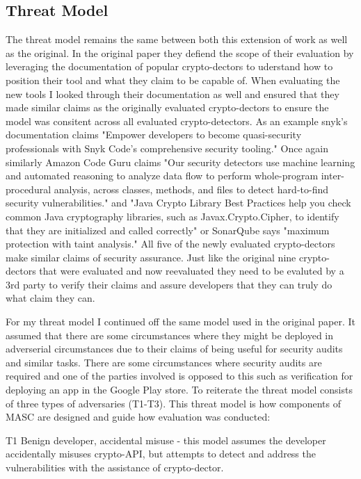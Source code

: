 \subsection{Threat Model}
\label{ch1:subsec:ThreatModel}

The threat model remains the same between both this extension of work as well as the original. In the original paper they defiend the scope of their evaluation by leveraging the documentation of popular crypto-dectors to uderstand how to position their tool and what they claim to be capable of. When evaluating the new tools I looked through their documentation as well and ensured that they made similar claims as the originally evaluated crypto-dectors to ensure the model was consitent across all evaluated crypto-detectors. As an example snyk's documentation claims "Empower developers to become quasi-security professionals with Snyk Code’s comprehensive security tooling." \cite{snyk} Once again similarly Amazon Code Guru claims "Our security detectors use machine learning and automated reasoning to analyze data flow to perform whole-program inter-procedural analysis, across classes, methods, and files to detect hard-to-find security vulnerabilities." \cite{codeguru} and "Java Crypto Library Best Practices help you check common Java cryptography libraries, such as Javax.Crypto.Cipher, to identify that they are initialized and called correctly" or SonarQube says "maximum protection with taint analysis." \cite{sonarqube} All five of the newly evaluated crypto-dectors make similar claims of security assurance. Just like the original nine crypto-dectors that were evaluated and now reevaluated they need to be evaluted by a 3rd party to verify their claims and assure developers that they can truly do what claim they can.

For my threat model I continued off the same model used in the original paper. It assumed that there are some circumstances where they might be deployed in adverserial circumstances due to their claims of being useful for security audits and similar tasks. There are some circumstances where security audits are required and one of the parties involved is opposed to this such as verification for deploying an app in the Google Play store. To reiterate the threat model consists of three types of adversaries (T1-T3). This threat model is how components of MASC are designed and guide how evaluation was conducted:

T1 Benign developer, accidental misuse - this model assumes the developer accidentally misuses crypto-API, but attempts to detect and address the vulnerabilities with the assistance of crypto-dector.

